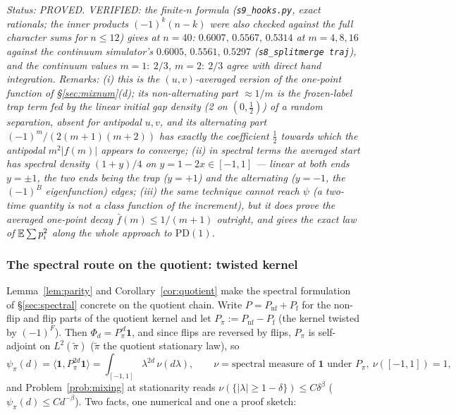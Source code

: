 \emph{Status: PROVED.  VERIFIED: the finite-$n$ formula
(\texttt{s9\_hooks.py}, exact rationals; the inner products
$(-1)^k(n-k)$ were also checked against the full character sums for
$n\le12$) gives at $n=40$: $0.6007,\,0.5567,\,0.5314$ at $m=4,8,16$
against the continuum simulator's $0.6005,\,0.5561,\,0.5297$
(\texttt{s8\_splitmerge traj}), and the continuum values
$m=1:\ 2/3$, $m=2:\ 2/3$ agree with direct hand integration.
Remarks: (i) this is the $(u,v)$-averaged version of the one-point
function of \S\ref{sec:mixnum}(d); its non-alternating part
$\approx1/m$ is the frozen-label trap term fed by the linear initial
gap density (2 on $(0,\tfrac12)$) of a random separation, absent for
antipodal $u,v$, and its alternating part $(-1)^m/(2(m+1)(m+2))$ has
exactly the coefficient $\tfrac12$ towards which the antipodal
$m^2|f(m)|$ appears to converge; (ii) in spectral terms the averaged
start has spectral density $(1+y)/4$ on $y=1-2x\in[-1,1]$ --- linear
at \emph{both} ends $y=\pm1$, the two ends being the trap ($y=+1$)
and the alternating ($y=-1$, the $(-1)^{B}$ eigenfunction) edges;
(iii) the same technique cannot reach $\psi$ (a two-time quantity is
not a class function of the increment), but it does prove the
averaged one-point decay $\bar f(m)\le1/(m+1)$ outright, and gives
the exact law of $\mathbb{E}\sum p_i^2$ along the whole approach to
$\mathrm{PD}(1)$.}

\subsubsection{The spectral route on the quotient: twisted kernel}
\label{sec:twisted}

Lemma~\ref{lem:parity} and Corollary~\ref{cor:quotient} make the
spectral formulation of \S\ref{sec:spectral} concrete on the quotient
chain.  Write $P=P_{\mathrm{nf}}+P_{\mathrm f}$ for the non-flip and
flip parts of the quotient kernel and let
$P_\pi:=P_{\mathrm{nf}}-P_{\mathrm f}$ (the kernel twisted by
$(-1)^{F}$).  Then $\Phi_d=P_\pi^{\,d}\mathbf 1$, and since flips are
reversed by flips, $P_\pi$ is self-adjoint on $L^2(\tilde\pi)$
($\tilde\pi$ the quotient stationary law), so
\[
\psi_\pi(d)=\langle\mathbf 1,P_\pi^{2d}\mathbf 1\rangle
=\int_{[-1,1]}\lambda^{2d}\,\nu(d\lambda),\qquad
\nu=\text{spectral measure of }\mathbf 1\text{ under }P_\pi,\ \nu([-1,1])=1,
\]
and Problem~\ref{prob:mixing} at stationarity reads
$\nu(\{|\lambda|\ge1-\delta\})\le C\delta^{\beta}$
($\psi_\pi(d)\le Cd^{-\beta}$).  Two facts, one numerical and one a
proof sketch:

